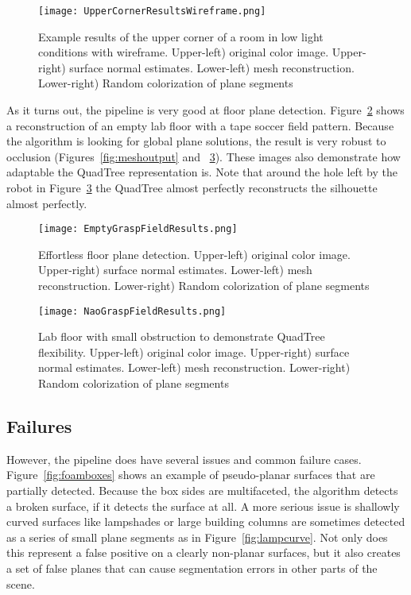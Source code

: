 \begin{figure}[!htpb]
    \centering
    \texttt{[image: UpperCornerResultsWireframe.png]}
    \caption{Example results of the upper corner of a room in low light conditions with wireframe.  Upper-left) original color image. Upper-right) surface normal estimates. Lower-left) mesh reconstruction. Lower-right) Random colorization of plane segments}
    \label{fig:uppercornerwireframelowlight}
\end{figure}
As it turns out, the pipeline is very good at floor plane detection. Figure~\ref{fig:floorplane} shows a reconstruction of an empty lab floor with a tape soccer field pattern. Because the algorithm is looking for global plane solutions, the result is very robust to occlusion (Figures~\ref{fig:meshoutput} and ~\ref{fig:naoquadtree}). These images also demonstrate how adaptable the QuadTree representation is. Note that around the hole left by the robot in Figure~\ref{fig:naoquadtree} the QuadTree almost perfectly reconstructs the silhouette almost perfectly.

\begin{figure}[!htpb]
    \centering
    \texttt{[image: EmptyGraspFieldResults.png]}
    \caption{Effortless floor plane detection. Upper-left) original color image. Upper-right) surface normal estimates. Lower-left) mesh reconstruction. Lower-right) Random colorization of plane segments}
    \label{fig:floorplane}
\end{figure}


\begin{figure}[!htpb]
    \centering
    \texttt{[image: NaoGraspFieldResults.png]}
    \caption{Lab floor with small obstruction to demonstrate QuadTree flexibility. Upper-left) original color image. Upper-right) surface normal estimates. Lower-left) mesh reconstruction. Lower-right) Random colorization of plane segments}
    \label{fig:naoquadtree}
\end{figure}


\subsection{Failures}
However, the pipeline does have several issues and common failure cases. Figure~\ref{fig:foamboxes} shows an example of pseudo-planar surfaces that are partially detected. Because the box sides are multifaceted, the algorithm detects a broken surface, if it detects the surface at all. A more serious issue is shallowly curved surfaces like lampshades or large building columns are sometimes detected as a series of small plane segments as in Figure~\ref{fig:lampcurve}. Not only does this represent a false positive on a clearly non-planar surfaces, but it also creates a set of false planes that can cause segmentation errors in other parts of the scene.

